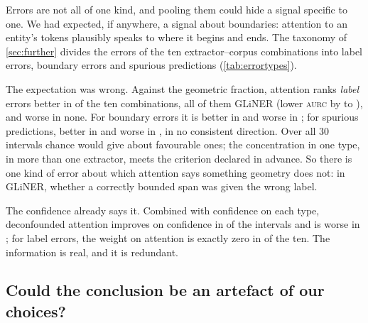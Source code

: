 \documentclass[11pt,a4paper]{article}
\newcommand{\gliner}{GLiNER}
\newcommand{\aurc}{\textsc{aurc}}
\begin{document}
Errors are not all of one kind, and pooling them could hide a signal specific to one. We had expected, if anywhere, a
signal about boundaries: attention to an entity's tokens plausibly speaks to where it begins and ends. The taxonomy of
\cref{sec:further} divides the errors of the ten extractor--corpus combinations into \errNLabel{} label errors,
\errNBound{} boundary errors and \errNSpur{} spurious predictions (\cref{tab:errortypes}).

The expectation was wrong. Against the geometric fraction, attention ranks \emph{label} errors better in \errEoneLabelFav{}
of the ten combinations, all of them \gliner{} (lower \aurc{} by \errLabelAbsMin{} to \errLabelAbsMax), and worse in none. For
boundary errors it is better in \errEoneBoundFav{} and worse in \errEoneBoundAdv{}; for spurious predictions, better in
\errEoneSpurFav{} and worse in \errEoneSpurAdv{}, in no consistent direction. Over all 30 intervals chance
would give about \errEoneChance{} favourable ones; the concentration in one type, in more than one extractor, meets the
criterion declared in advance. So there is one kind of error about which attention says something geometry does not: in
\gliner{}, whether a correctly bounded span was given the wrong label.

The confidence already says it. Combined with confidence on each type, deconfounded attention improves on confidence in
\errEtwoFav{} of the intervals and is worse in \errEtwoAdv; for label errors, the weight on attention is exactly zero in
\errEtwoLabelDeg{} of the ten. The information is real, and it is redundant.

\begin{table}[t]
\centering
\small
\caption{Errors by type (\cref{sec:further}) and the difference in \aurc{} between attention mass and the geometric
fraction (causal for the decoders) on the set formed by all correct predictions and the errors of one type. Negative values
favour attention. Bold with $\downarrow$: the 95\% interval lies below zero; $\uparrow$: above zero; 0: degenerate interval.
Test partition; decoders in the calibrated direction.}
\label{tab:errortypes}
\setlength{\tabcolsep}{4pt}

\end{table}

\subsection{Could the conclusion be an artefact of our choices?}
\label{sec:res-escapes}
\end{document}
